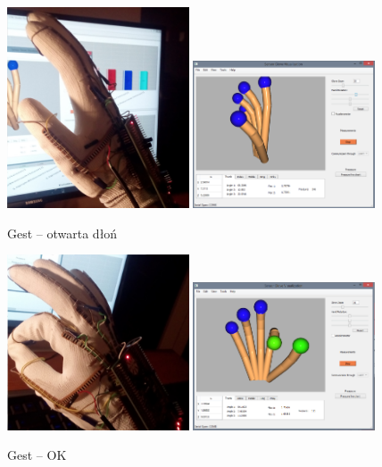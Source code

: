 \documentclass[10pt,a4paper]{article}
\begin{document}
\begin{figure}[!htb]
\centering
    \subfloat
    {
      \includegraphics[width=0.48\textwidth]{./Palm.jpg}
    }
    \subfloat
    {
      \includegraphics[width=0.48\textwidth]{./PalmQt.png}
    }
    \caption{Gest -- otwarta dłoń \label{fig:Palm}}
\end{figure}
\begin{figure}[!htb]
\centering
    \subfloat
    {
      \includegraphics[width=0.48\textwidth]{./OK.jpg}
    }
    \subfloat
    {
      \includegraphics[width=0.48\textwidth]{./OKQt.png}
    }
    \caption{Gest -- OK \label{fig:OK}}
\end{figure}
\end{document}

